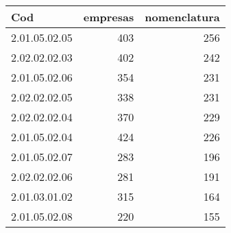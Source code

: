 \begin{table}[ht]
\centering
\begin{tabular}{lrr}
  \hline
Cod & empresas & nomenclatura \\ 
  \hline
2.01.05.02.05 & 403 & 256 \\ 
  2.02.02.02.03 & 402 & 242 \\ 
  2.01.05.02.06 & 354 & 231 \\ 
  2.02.02.02.05 & 338 & 231 \\ 
  2.02.02.02.04 & 370 & 229 \\ 
  2.01.05.02.04 & 424 & 226 \\ 
  2.01.05.02.07 & 283 & 196 \\ 
  2.02.02.02.06 & 281 & 191 \\ 
  2.01.03.01.02 & 315 & 164 \\ 
  2.01.05.02.08 & 220 & 155 \\ 
   \hline
\end{tabular}
\end{table}
